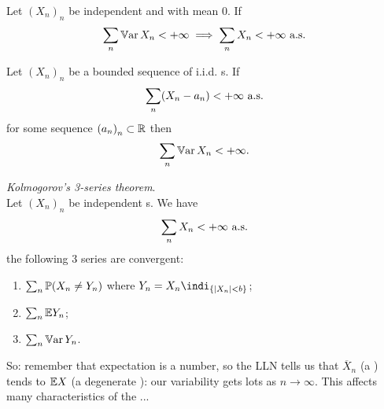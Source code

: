 \documentclass{report}
\begin{document}
\begin{proposition}
	Let ${(X_n)}_{n}$ be independent and with mean 0. If
	\[\sum_n\mathbb{V}\mathrm{ar}\, X_n<+\infty\implies\sum_{n}X_n<+\infty\text{ a.s.}\]
\end{proposition}
\begin{proposition}
	Let ${(X_n)}_{n}$ be a bounded sequence of i.i.d. \rv s. If
	\[\sum_n(X_n-a_n)<+\infty\text{ a.s.}\]
	for some sequence ${(a_n)}_{n}\subset\mathbb{R}$ then
	\[\sum_n\mathbb{V}\mathrm{ar}\, X_n<+\infty.\]
\end{proposition}
\begin{theorem}
	\emph{Kolmogorov's 3-series theorem}.\\
	Let ${(X_n)}_{n}$ be independent \rv s. We have
	\[\sum_{n}X_n<+\infty\text{ a.s.}\]
	\ifonly{} the following 3 series are convergent:
	\begin{enumerate}
		\item $\sum_n\mathbb{P}(X_n\neq Y_n)$ where $Y_n=X_n\indi_{\{|X_n|<b\}}$;
		\item $\sum_n\mathbb{E} Y_n$;
		\item $\sum_n\mathbb{V}\mathrm{ar}\, Y_n$.
	\end{enumerate}
\end{theorem}
So: remember that expectation is a number, so the LLN tells us that $\overline{X}_{n}$ (a \rv) tends to $\mathbb{E} X$ (a degenerate \rv): our variability gets lots as $n\to\infty$. This affects many characteristics of the \rv...
\end{document}
